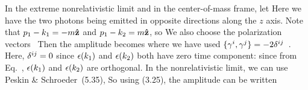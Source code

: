 \documentclass[11pt]{article}
\begin{document}
{	In the extreme nonrelativistic limit and in the center-of-mass frame, let
	Here we have the two photons being emitted in opposite directions along the $z$ axis.  Note that $p_1 - k_1 = -m \vb{\hat{z}}$ and $p_1 - k_2 = m \vb{\hat{z}}$, so
	We also choose the polarization vectors~\cite[p.~124]{Peskin}
	Then the amplitude becomes
	where we have used $\{ \gamma^i, \gamma^j \} = -2 \delta^{i j}$~\cite[p.~41]{Peskin}.  Here, $\delta^{i j} = 0$ since $\epsilon(k_1)$ and $\epsilon(k_2)$ both have zero time component:
	since from Eq.~, $\epsilon(k_1)$ and $\epsilon(k_2)$ are orthogonal.  In the nonrelativistic limit, we can use Peskin \& Schroeder~(5.35),
	So using (3.25), the amplitude can be written
	}
\end{document}
